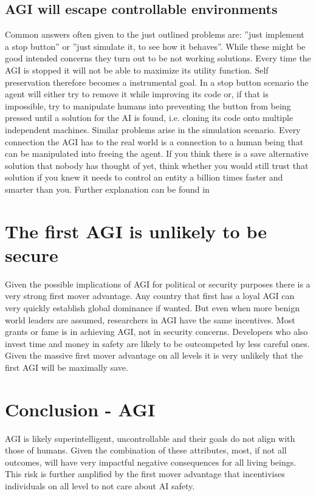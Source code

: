 \documentclass[conference]{IEEEtran}
\begin{document}
\subsection{AGI will escape controllable environments}

Common answers often given to the just outlined problems are: ''just implement a stop button'' or ''just simulate it, to see how it behaves''. While these might be good intended concerns they turn out to be not working solutions. Every time the AGI is stopped it will not be able to maximize its utility function. Self preservation therefore becomes a instrumental goal. In a stop button scenario the agent will either try to remove it while improving its code or, if that is impossible, try to manipulate humans into preventing the button from being pressed until a solution for the AI is found, i.e. cloning its code onto multiple independent machines. Similar problems arise in the simulation scenario. Every connection the AGI has to the real world is a connection to a human being that can be manipulated into freeing the agent. If you think there is a save alternative solution that nobody has thought of yet, think whether you would still trust that solution if you knew it needs to control an entity a billion times faster and smarter than you. Further explanation can be found in \cite{StopButtonMiles2017}

\section{The first AGI is unlikely to be secure}
%
Given the possible implications of AGI for political or security purposes there is a very strong first mover advantage. Any country that first has a loyal AGI can very quickly establish global dominance if wanted. But even when more benign world leaders are assumed, researchers in AGI have the same incentives. Most grants or fame is in achieving AGI, not in security concerns. Developers who also invest time and money in safety are likely to be outcompeted by less careful ones. Given the massive first mover advantage on all levels it is very unlikely that the first AGI will be maximally save.
 
\section{Conclusion - AGI}

AGI is likely superintelligent, uncontrollable and their goals do not align with those of humans. Given the combination of these attributes, most, if not all outcomes, will have very impactful negative consequences for all living beings. This risk is further amplified by the first mover advantage that incentivises individuals on all level to not care about AI safety.
\end{document}
